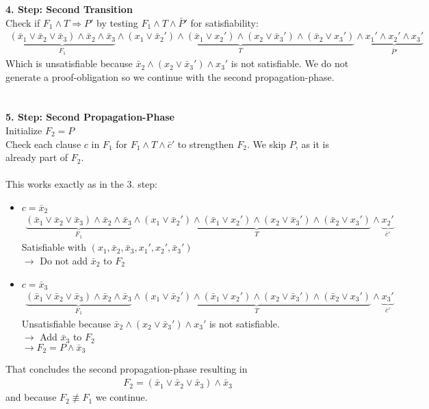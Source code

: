 \documentclass[11pt, a4paper, BCOR=10mm, ngerman, oneside]{scrbook}
\begin{document}
\textbf{4. Step: Second Transition} \\
Check if $F_1 \land T \Rightarrow P'$ by testing $F_1 \land T \land \bar P'$ for satisfiability: 
\begin{align*}
\underbrace{(\bar x_1 \lor \bar x_2 \lor \bar x_3) \land \bar x_2 \land \bar x_3}_{F_1} \land \underbrace{(x_1 \lor \bar x_2' ) \land ( \bar x_1 \lor x_2') \land (x_2 \lor \bar x_3') \land ( \bar x_2 \lor x_3')}_{T} \land \underbrace{x_1' \land x_2' \land x_3'}_{ \bar P'}
\end{align*}
Which is unsatisfiable because $\bar x_2 \land (x_2 \lor \bar x_3') \land x_3'$ is not satisfiable. We do not generate a proof-obligation so we continue with the second propagation-phase. \\ \\ \\

\textbf{5. Step: Second Propagation-Phase} \\
Initialize $F_2 = P$ \\
Check each clause $c$ in $F_1$ for $F_1 \land T \land \bar c'$ to strengthen $F_2$. We skip $P$, as it is already part of $F_2$. \\ \\
This works exactly as in the 3. step: \\
\begin{itemize}
\item $c = \bar x_2$ 
\begin{align*}
\underbrace{(\bar x_1 \lor \bar x_2 \lor \bar x_3) \land \bar x_2 \land \bar x_3}_{F_1} \land \underbrace{(x_1 \lor \bar x_2' ) \land ( \bar x_1 \lor x_2') \land (x_2 \lor \bar x_3') \land ( \bar x_2 \lor x_3')}_{T} \land \underbrace{x_2'}_{\bar c'}
\end{align*}
Satisfiable with $(x_1, \bar x_2, \bar x_3, x_1', x_2', \bar x_3')$ \\
$\rightarrow$ Do not add $\bar x_2$ to $F_2$ \\

\item $c = \bar x_3$ 
\begin{align*} 
\underbrace{(\bar x_1 \lor \bar x_2 \lor \bar x_3) \land \bar x_2 \land \bar x_3}_{F_1} \land \underbrace{(x_1 \lor \bar x_2' ) \land ( \bar x_1 \lor x_2') \land (x_2 \lor \bar x_3') \land ( \bar x_2 \lor x_3')}_{T} \land \underbrace{x_3'}_{\bar c'}
\end{align*}
Unsatisfiable because $\bar x_2 \land (x_2 \lor \bar x_3') \land x_3'$ is not satisfiable. \\ $\rightarrow$ Add $\bar x_3$ to $F_2$ \\ $\rightarrow F_2 = P \land \bar x_3$
\end{itemize}
That concludes the second propagation-phase resulting in 
\begin{align*}
F_2 = (\bar x_1 \lor \bar x_2 \lor \bar x_3) \land \bar x_3
\end{align*}
and because $F_2 \not\equiv F_1$ we continue. \\ \\
\end{document}

